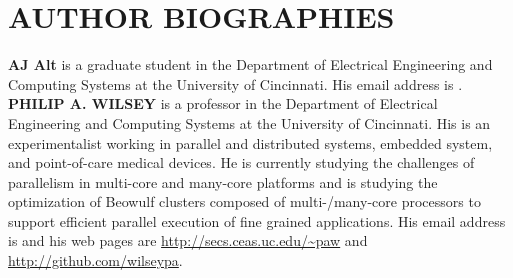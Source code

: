 \documentclass{wscpaperproc}
\begin{document}



\section*{AUTHOR BIOGRAPHIES}

\noindent \textbf{AJ Alt} is a graduate student in the Department of Electrical Engineering and Computing Systems at the University of Cincinnati. His email address is .\\

\noindent \textbf{PHILIP A. WILSEY} is a professor in the Department of Electrical Engineering and Computing Systems at the University of Cincinnati. His is an experimentalist working in parallel and distributed systems, embedded system, and point-of-care medical devices. He is currently studying the challenges of parallelism in multi-core and many-core platforms and is studying the optimization of Beowulf clusters composed of multi-/many-core processors to support efficient parallel execution of fine grained applications. His email address is  and his web pages are \url{http://secs.ceas.uc.edu/~paw} and \url{http://github.com/wilseypa}.
\end{document}
